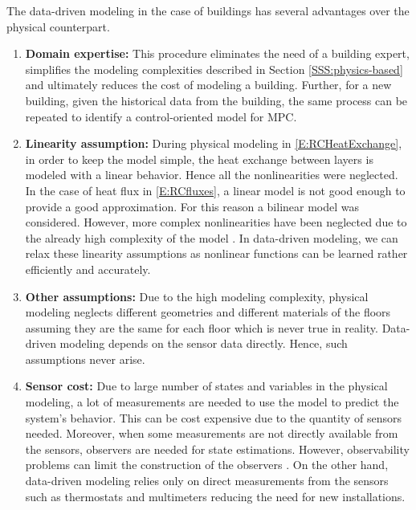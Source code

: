 The data-driven modeling in the case of buildings has several advantages over the physical counterpart.
\begin{enumerate}
	
	\item \textbf{Domain expertise:} This procedure eliminates the need of a building expert, simplifies the modeling complexities described in Section \ref{SSS:physics-based} and ultimately reduces the cost of modeling a building. Further, for a new building, given the historical data from the building, the same process can be repeated to identify a control-oriented model for MPC.
	
	\item \textbf{Linearity assumption:} During physical modeling in \eqref{E:RCHeatExchange}, in order to keep the model simple, the heat exchange between layers is modeled with a linear behavior. 
	Hence all the nonlinearities were neglected.
	In the case of heat flux in \eqref{E:RCfluxes}, a linear model is not good enough to provide a good approximation. For this reason a bilinear model was considered.
	However, more complex nonlinearities have been neglected due to the already high complexity of the model \cite{Sturzenegger2016}. 
	In data-driven modeling, we can relax these linearity assumptions as nonlinear functions can be learned rather efficiently and accurately.

	\item \textbf{Other assumptions:} Due to the high modeling complexity, physical modeling neglects different geometries and different materials of the floors assuming they are the same for each floor which is never true in reality.
	Data-driven modeling depends on the sensor data directly. 
	Hence, such assumptions never arise.
	
	
	
	\item \textbf{Sensor cost:} Due to large number of states and variables in the physical modeling, a lot of measurements are needed to use the model to predict the system's behavior.
	This can be cost expensive due to the quantity of sensors needed.
	Moreover, when some measurements are not directly available from the sensors, observers are needed for state estimations.
	However, observability problems can limit the construction of the observers \cite{Dorf2011MCS}. 
	On the other hand, data-driven modeling relies only on direct measurements from the sensors such as thermostats and multimeters reducing the need for new installations.
\end{enumerate}

